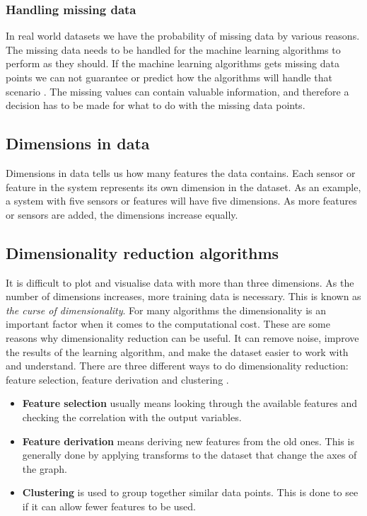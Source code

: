 \documentclass[english, a4paper]{report}
\begin{document}
{{{            \subsubsection{Handling missing data}
            {
                In real world datasets we have the probability of missing data by various reasons. The missing data needs to be handled for the machine learning algorithms to perform as they should. If the machine learning algorithms gets missing data points we can not guarantee or predict how the algorithms will handle that scenario \cite{dataPreprocessing}. The missing values can contain valuable information, and therefore a decision has to be made for what to do with the missing data points. 
            }
        }
        
        \subsection{Dimensions in data}
        {
            Dimensions in data tells us how many features the data contains. Each sensor or feature in the system represents its own dimension in the dataset. As an example, a system with five sensors or features will have five dimensions. As more features or sensors are added, the dimensions increase equally.
        }
        
        \subsection{Dimensionality reduction algorithms}
        {
            It is difficult to plot and visualise data with more than three dimensions. As the number of dimensions increases, more training data is necessary. This is known as \textit{the curse of dimensionality}. For many algorithms the dimensionality is an important factor when it comes to the computational cost. These are some reasons why dimensionality reduction can be useful. It can remove noise, improve the results of the learning algorithm, and make the dataset easier to work with and understand. There are three different ways to do dimensionality reduction: feature selection, feature derivation and clustering \cite{mlMarsland}.
            
            \begin{itemize}
                \item \textbf{Feature selection} usually means looking through the available features and checking the correlation with the output variables. 
                \item \textbf{Feature derivation} means deriving new features from the old ones. This is generally done by applying transforms to the dataset that change the axes of the graph. 
                \item \textbf{Clustering} is used to group together similar data points. This is done to see if it can allow fewer features to be used.
            \end{itemize} 
            
}}}
\end{document}
